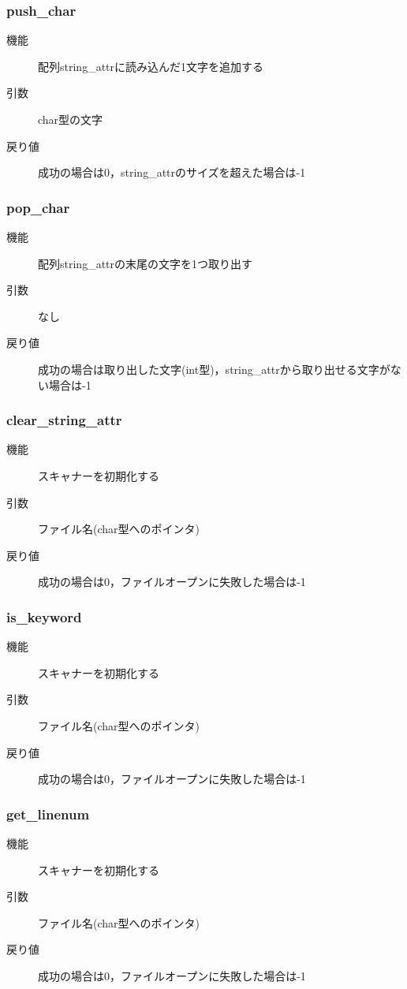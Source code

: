 \documentclass{jlreq}
\begin{document}
\subsubsection{push\_char}
\begin{description}
  \item[機能] 配列string\_attrに読み込んだ1文字を追加する
  \item[引数] char型の文字
  \item[戻り値] 成功の場合は0，string\_attrのサイズを超えた場合は-1
\end{description}

\subsubsection{pop\_char}
\begin{description}
  \item[機能] 配列string\_attrの末尾の文字を1つ取り出す
  \item[引数] なし
  \item[戻り値] 成功の場合は取り出した文字(int型)，string\_attrから取り出せる文字がない場合は-1
\end{description}

\subsubsection{clear\_string\_attr}
\begin{description}
  \item[機能] スキャナーを初期化する
  \item[引数] ファイル名(char型へのポインタ)
  \item[戻り値] 成功の場合は0，ファイルオープンに失敗した場合は-1
\end{description}

\subsubsection{is\_keyword}
\begin{description}
  \item[機能] スキャナーを初期化する
  \item[引数] ファイル名(char型へのポインタ)
  \item[戻り値] 成功の場合は0，ファイルオープンに失敗した場合は-1
\end{description}

\subsubsection{get\_linenum}
\begin{description}
  \item[機能] スキャナーを初期化する
  \item[引数] ファイル名(char型へのポインタ)
  \item[戻り値] 成功の場合は0，ファイルオープンに失敗した場合は-1
\end{description}
\end{document}
